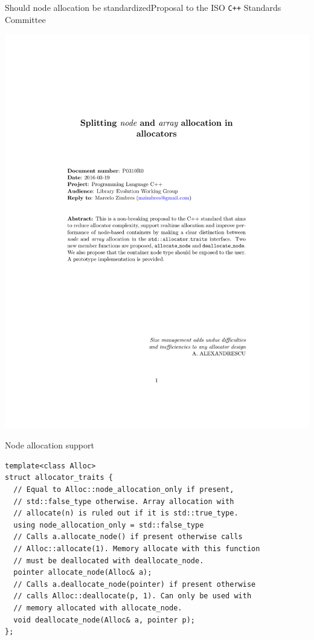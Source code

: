 \documentclass[10pt,aspectratio=169]{beamer}
\begin{document}
\begin{frame}{Should node allocation be standardized}{Proposal to the ISO \texttt{C++} Standards Committee}
\vspace{-3cm}
    \begin{center}
        \includegraphics[scale=0.6]{fig/prop1.pdf} \\
    \end{center}
\end{frame}

\begin{frame}[fragile]{Node allocation support}

\begin{lstlisting}
template<class Alloc>
struct allocator_traits {
  // Equal to Alloc::node_allocation_only if present,
  // std::false_type otherwise. Array allocation with
  // allocate(n) is ruled out if it is std::true_type.
  using node_allocation_only = std::false_type
  // Calls a.allocate_node() if present otherwise calls
  // Alloc::allocate(1). Memory allocate with this function
  // must be deallocated with deallocate_node.
  pointer allocate_node(Alloc& a);
  // Calls a.deallocate_node(pointer) if present otherwise
  // calls Alloc::deallocate(p, 1). Can only be used with
  // memory allocated with allocate_node.
  void deallocate_node(Alloc& a, pointer p);
};
\end{lstlisting}

\end{frame}
\end{document}
